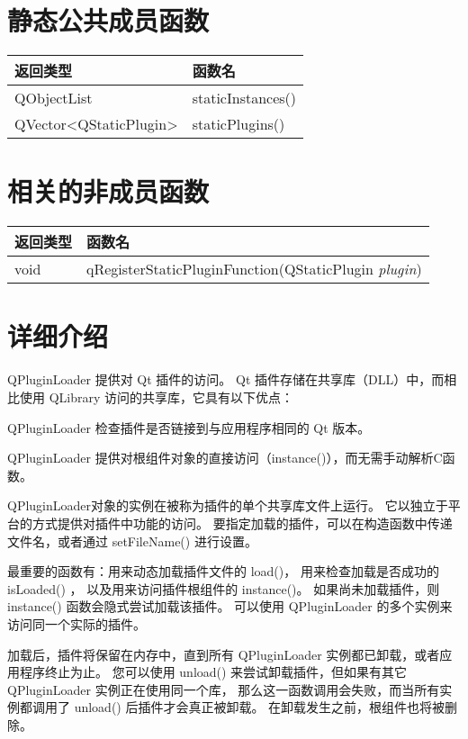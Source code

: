 \section{静态公共成员函数}

\begin{tabular}{|l|l|}
\hline
返回类型& 	函数名\\
\hline
QObjectList	&staticInstances() \\
\hline
QVector<QStaticPlugin> &	staticPlugins() \\
\hline
\end{tabular}


\section{相关的非成员函数}

\begin{tabular}{|l|l|}
\hline
返回类型& 	函数名\\
\hline
void	& qRegisterStaticPluginFunction(QStaticPlugin \emph{plugin}) \\
\hline
\end{tabular}


\section{详细介绍}

QPluginLoader 提供对 Qt 插件的访问。
Qt 插件存储在共享库（DLL）中，而相比使用 QLibrary 访问的共享库，它具有以下优点：

\begin{compactitem}
\item QPluginLoader 检查插件是否链接到与应用程序相同的 Qt 版本。
\item QPluginLoader 提供对根组件对象的直接访问（instance()），而无需手动解析C函数。
\end{compactitem}

QPluginLoader对象的实例在被称为插件的单个共享库文件上运行。
它以独立于平台的方式提供对插件中功能的访问。
要指定加载的插件，可以在构造函数中传递文件名，或者通过 setFileName() 进行设置。

最重要的函数有：用来动态加载插件文件的 load()，
用来检查加载是否成功的 isLoaded() ， 以及用来访问插件根组件的 instance()。
如果尚未加载插件，则 instance() 函数会隐式尝试加载该插件。
 可以使用 QPluginLoader 的多个实例来访问同一个实际的插件。

加载后，插件将保留在内存中，直到所有 QPluginLoader 实例都已卸载，或者应用程序终止为止。
您可以使用 unload() 来尝试卸载插件，但如果有其它 QPluginLoader 实例正在使用同一个库，
那么这一函数调用会失败，而当所有实例都调用了 unload() 后插件才会真正被卸载。
在卸载发生之前，根组件也将被删除。

